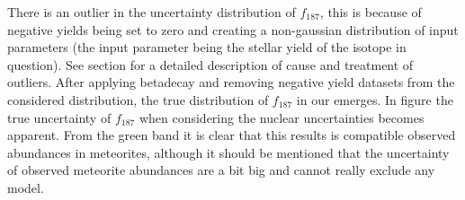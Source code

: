 There is an outlier in the uncertainty distribution of $f_{187}$, this is because of negative yields being set to zero and creating a non-gaussian distribution of input parameters (the input parameter being the stellar yield of the isotope in question). See section  for a detailed description of cause and treatment of outliers.
After applying betadecay and removing negative yield datasets from the considered distribution, the true distribution of $f_{187}$ in our \fiduccialomega emerges.
In figure  the true uncertainty of $f_{187}$ when considering the nuclear uncertainties becomes apparent.
From the green band it is clear that this results is compatible observed abundances in meteorites, although it should be mentioned that the uncertainty of observed meteorite abundances are a bit big and cannot really exclude any model.

